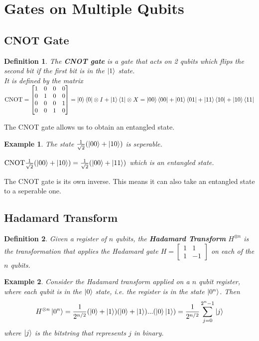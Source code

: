 \documentclass[12pt,twoside,fleqn]{report}
\theoremstyle{thmstyle}
\newtheorem{defn}{Definition}[chapter]
\newtheorem{eg}{Example}[chapter]
\begin{document}
\section{Gates on Multiple Qubits}

\subsection{CNOT Gate}
\begin{defn}
    The \textbf{CNOT gate} is a gate that acts on 2 qubits which flips the second bit if the first bit is in the $\ket{1}$ state.\\
    It is defined by the matrix $\text{CNOT} = \begin{bmatrix} 1 & 0 & 0 & 0 \\ 0 & 1 & 0 & 0 \\ 0 & 0 & 0 & 1 \\ 0 & 0 & 1 & 0 \end{bmatrix} = \ket{0}\bra{0} \otimes I + \ket{1}\bra{1} \otimes X = \ket{00}\bra{00} + \ket{01}\bra{01} + \ket{11} \bra{10} + \ket{10} \bra{11}$ 
\end{defn}
The CNOT gate allows us to obtain an entangled state.
\begin{eg}
    The state $\frac{1}{\sqrt{2}}(\ket{00} + \ket{10})$ is seperable.

    $\text{CNOT} \frac{1}{\sqrt{2}}(\ket{00} + \ket{10}) = \frac{1}{\sqrt{2}} (\ket{00} + \ket{11}) $ which is an entangled state.
\end{eg}

The CNOT gate is its own inverse. This means it can also take an entangled state to a seperable one.

\subsection{Hadamard Transform}
\begin{defn}
    Given a register of $n$ qubits, the \textbf{Hadamard Transform} $H^{\otimes n}$ is the transformation that applies the Hadamard gate $H = \begin{bmatrix} 1 & 1 \\ 1 & -1 \end{bmatrix}$ on each of the $n$ qubits.
\end{defn}
\begin{eg}
    Consider the Hadamard transform applied on a $n$ qubit register, where each qubit is in the $\ket{0}$ state, i.e. the register is in the state $\ket{0^n}$.
    Then \[ H^{\otimes n} \ket{0^n} = \frac{1}{2^{n/2}} (\ket{0} + \ket{1})(\ket{0} + \ket{1})...(\ket{0} \ket{1}) = \frac{1}{2^{n/2}} \sum_{j=0}^{2^n-1} \ket{j} \] where $\ket{j}$ is the bitstring that represents $j$ in binary.
\end{eg}
\end{document}
